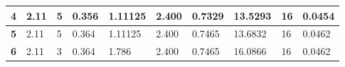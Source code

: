 \begin{table}[h]
{\begin{tabular}{|l|l|l|l|l|l|l|l|l|l|}
\textbf{4}                               & 2.11                                                                                     & 5                                                                                                    & 0.356                                                                                                    & 1.11125                                                                                                 & 2.400                                                                                           & 0.7329                                                                                            & 13.5293                                                                                           & 16                                                                                    & 0.0454                                                                                     \\ \hline
\textbf{5}                               & 2.11                                                                                     & 5                                                                                                    & 0.364                                                                                                    & 1.11125                                                                                                 & 2.400                                                                                           & 0.7465                                                                                            & 13.6832                                                                                       & 16                                                                                    & 0.0462                                                                                     \\ \hline
\textbf{6}                               & 2.11                                                                                     & 3                                                                                                    & 0.364                                                                                                    & {\color[HTML]{444444} 1.786}                                                                            & 2.400                                                                                           & 0.7465                                                                                            & 16.0866                                                                                          & 16                                                                                    & 0.0462                                                                                     \\ \hline

\end{tabular}}
\end{table}
